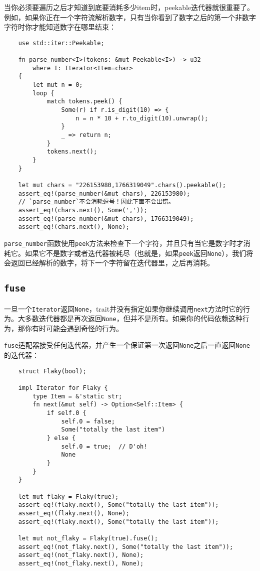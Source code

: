 当你必须要遍历之后才知道到底要消耗多少item时，peekable迭代器就很重要了。例如，如果你正在一个字符流解析数字，只有当你看到了数字之后的第一个非数字字符时你才能知道数字在哪里结束：
\begin{verbatim}
    use std::iter::Peekable;

    fn parse_number<I>(tokens: &mut Peekable<I>) -> u32
        where I: Iterator<Item=char>
    {
        let mut n = 0;
        loop {
            match tokens.peek() {
                Some(r) if r.is_digit(10) => {
                    n = n * 10 + r.to_digit(10).unwrap();
                }
                _ => return n;
            }
            tokens.next();
        }
    }

    let mut chars = "226153980,1766319049".chars().peekable();
    assert_eq!(parse_number(&mut chars), 226153980);
    // `parse_number`不会消耗逗号！因此下面不会出错。
    assert_eq!(chars.next(), Some(','));
    assert_eq!(parse_number(&mut chars), 1766319049);
    assert_eq!(chars.next(), None);
\end{verbatim}


\texttt{parse\_number}函数使用\texttt{peek}方法来检查下一个字符，并且只有当它是数字时才消耗它。如果它不是数字或者迭代器被耗尽（也就是，如果\texttt{peek}返回\texttt{None}），我们将会返回已经解析的数字，将下一个字符留在迭代器里，之后再消耗。

\subsection{\texttt{fuse}}\label{fuse}
一旦一个\texttt{Iterator}返回\texttt{None}，trait并没有指定如果你继续调用\texttt{next}方法时它的行为。大多数迭代器都是再次返回\texttt{None}，但并不是所有。如果你的代码依赖这种行为，那你有时可能会遇到奇怪的行为。

\texttt{fuse}适配器接受任何迭代器，并产生一个保证第一次返回\texttt{None}之后一直返回\texttt{None}的迭代器：
\begin{verbatim}
    struct Flaky(bool);

    impl Iterator for Flaky {
        type Item = &'static str;
        fn next(&mut self) -> Option<Self::Item> {
            if self.0 {
                self.0 = false;
                Some("totally the last item")
            } else {
                self.0 = true;  // D'oh!
                None
            }
        }
    }

    let mut flaky = Flaky(true);
    assert_eq!(flaky.next(), Some("totally the last item"));
    assert_eq!(flaky.next(), None);
    assert_eq!(flaky.next(), Some("totally the last item"));

    let mut not_flaky = Flaky(true).fuse();
    assert_eq!(not_flaky.next(), Some("totally the last item"));
    assert_eq!(not_flaky.next(), None);
    assert_eq!(not_flaky.next(), None);
\end{verbatim}

